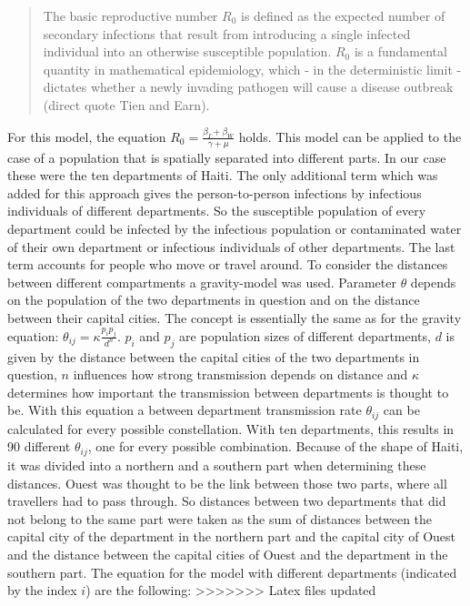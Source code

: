 \documentclass[11pt]{article}
\begin{document}
\begin{quotation}
The basic reproductive number $ R_{0} $ is defined as the expected number of secondary infections that result from introducing a single infected individual into an otherwise susceptible population. $ R_{0} $ is a fundamental quantity in mathematical epidemiology, which - in the deterministic limit - dictates whether a newly invading pathogen will cause a disease outbreak (direct quote Tien and Earn).
\end{quotation}

For this model, the equation $ R_{0}=\frac{\beta_{I}+\beta_{W}}{\gamma+\mu} $ holds.
This model can be applied to the case of a population  that is spatially separated into different parts. In our case these were the ten departments of Haiti. The only additional term which was added for this approach gives the person-to-person infections by infectious individuals of different departments. So the susceptible population of every department could be infected by the infectious population or contaminated water of their own department or infectious individuals of other departments. The last term accounts for people who move or travel around. To consider the distances between different compartments a gravity-model was used. Parameter $ \theta $ depends on the population of the two departments in question and on the distance between their capital cities. The concept is essentially the same as for the gravity equation: $ \theta_{ij}=\kappa\frac{p_{i}p_{j}}{d^{n}} $. $ p_{i} $ and $ p_{j} $ are population sizes of different departments, $ d $ is given by the distance between the capital cities of the two departments in question, $ n $ influences how strong transmission depends on distance and $ \kappa $ determines how important the transmission between departments is thought to be. With this equation a between department transmission rate $ \theta_{ij} $ can be calculated for every possible constellation. With ten departments, this results in 90 different $ \theta_{ij} $, one for every possible combination. Because of the shape of Haiti, it was divided into a northern and a southern part when determining these distances. Ouest was thought to be the link between those two parts, where all travellers had to pass through. So distances between two departments that did not belong to the same part were taken as the sum of distances between the capital city of the department in the northern part and the capital city of Ouest and the distance between the capital cities of Ouest and the department in the southern part.
The equation for the model with different departments (indicated by the index $ i $) are the following:
>>>>>>> Latex files updated
\end{document}

